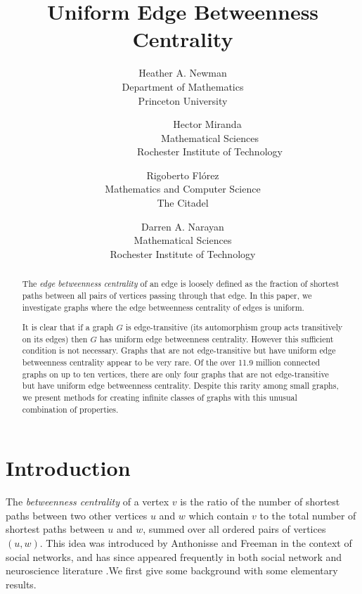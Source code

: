 \documentclass{article}%
\begin{document}
\title{Uniform Edge Betweenness Centrality}
\author{Heather A. Newman\\Department of Mathematics\\Princeton University
\and \ \ \ \ \ \ \ \ \ \ Hector Miranda\\\ \ \ \ \ \ \ \ \ \ \ Mathematical Sciences\\\ \ \ \ \ \ \ \ \ \ \ Rochester Institute of Technology
\and Rigoberto Fl\'{o}rez\\Mathematics and Computer Science\\The Citadel
\and Darren A. Narayan\\Mathematical Sciences\\Rochester Institute of Technology}
\maketitle

\begin{abstract}
The \textit{edge betweenness centrality} of an edge is loosely defined as the
fraction of shortest paths between all pairs of vertices passing through that
edge. In this paper, we investigate graphs where the edge betweenness
centrality of edges is uniform.

It is clear that if a graph $G$ is edge-transitive (its automorphism group
acts transitively on its edges) then $G$ has uniform edge betweenness
centrality. However this sufficient condition is not necessary. Graphs that
are not edge-transitive but have uniform edge betweenness centrality appear to
be very rare. Of the over 11.9 million connected graphs on up to ten vertices,
there are only four graphs that are not edge-transitive but have uniform edge
betweenness centrality. Despite this rarity among small graphs, we present
methods for creating infinite classes of graphs with this unusual combination
of properties.

\end{abstract}

\section{Introduction}

The \textit{betweenness centrality} of a vertex $v$ is the ratio of the number
of shortest paths between two other vertices $u$ and $w$ which contain $v$ to
the total number of shortest paths between $u$ and $w$, summed over all
ordered pairs of vertices $(u,w)$. This idea was introduced by Anthonisse
\cite{Anthonisse} and Freeman \cite{F} in the context of social networks, and
has since appeared frequently in both social network and neuroscience
literature
\cite{Freeman1,Schoch,Brandes,Freeman2,Gago,GagoUB,GagoS,BS,Grassi,White}%
.\newline\qquad We first give some background with some elementary results.
\end{document}
